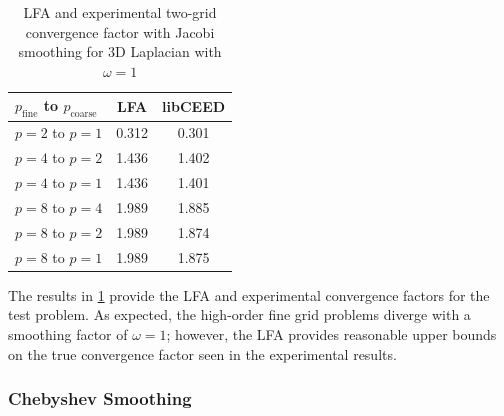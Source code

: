 \documentclass[review]{siamart190516}
\begin{document}
\begin{table}[ht!]
\begin{center}
\begin{tabular}{l c c}
  \toprule
  $p_{\text{fine}}$ to $p_{\text{coarse}}$  &  LFA  &  libCEED  \\
  \toprule
  $p = 2$ to $p = 1$   &  0.312  &  0.301  \\
  \midrule
  $p = 4$ to $p = 2$   &  1.436  &  1.402  \\
  $p = 4$ to $p = 1$   &  1.436  &  1.401  \\
  \midrule
  $p = 8$ to $p = 4$   &  1.989  &  1.885  \\
  $p = 8$ to $p = 2$   &  1.989  &  1.874  \\
  $p = 8$ to $p = 1$   &  1.989  &  1.875  \\
  \bottomrule
\end{tabular}
\end{center}
\caption{LFA and experimental two-grid convergence factor with Jacobi smoothing for 3D Laplacian with $\omega = 1$}
\label{table:two_grid_3d_jacobi}
\end{table}

The results in \cref{table:two_grid_3d_jacobi} provide the LFA and experimental convergence factors for the test problem.
As expected, the high-order fine grid problems diverge with a smoothing factor of $\omega = 1$; however, the LFA provides reasonable upper bounds on the true convergence factor seen in the experimental results.

\subsubsection{Chebyshev Smoothing}
\end{document}
